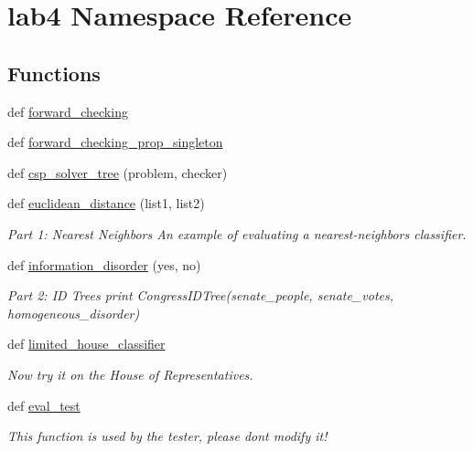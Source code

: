 \hypertarget{namespacelab4}{}\section{lab4 Namespace Reference}
\label{namespacelab4}
\subsection*{Functions}
\begin{DoxyCompactItemize}
\item 
def \hyperlink{namespacelab4_a89017da59eab7aaf4ba6a8e9e148b714}{forward\+\_\+checking}
\item 
def \hyperlink{namespacelab4_a8bb02f6dec7b66c837deacf38d0602bf}{forward\+\_\+checking\+\_\+prop\+\_\+singleton}
\item 
def \hyperlink{namespacelab4_a4ca0fb51c398a07cef35678f56ceef6a}{csp\+\_\+solver\+\_\+tree} (problem, checker)
\item 
def \hyperlink{namespacelab4_a64af0c00ffea4205cb40005854505cc9}{euclidean\+\_\+distance} (list1, list2)
\begin{DoxyCompactList}\small\item\em Part 1\+: Nearest Neighbors An example of evaluating a nearest-\/neighbors classifier. \end{DoxyCompactList}\item 
def \hyperlink{namespacelab4_afc4e3e4bf14bf03bc80bcb4e87106053}{information\+\_\+disorder} (yes, no)
\begin{DoxyCompactList}\small\item\em Part 2\+: I\+D Trees print Congress\+I\+D\+Tree(senate\+\_\+people, senate\+\_\+votes, homogeneous\+\_\+disorder) \end{DoxyCompactList}\item 
def \hyperlink{namespacelab4_afeb6f3043e63aad7e472bc70ac32b8cc}{limited\+\_\+house\+\_\+classifier}
\begin{DoxyCompactList}\small\item\em Now try it on the House of Representatives. \end{DoxyCompactList}\item 
def \hyperlink{namespacelab4_ab9f66836efa5bbcc08f6874e5bb5f049}{eval\+\_\+test}
\begin{DoxyCompactList}\small\item\em This function is used by the tester, please don\textquotesingle{}t modify it! \end{DoxyCompactList}\end{DoxyCompactItemize}

